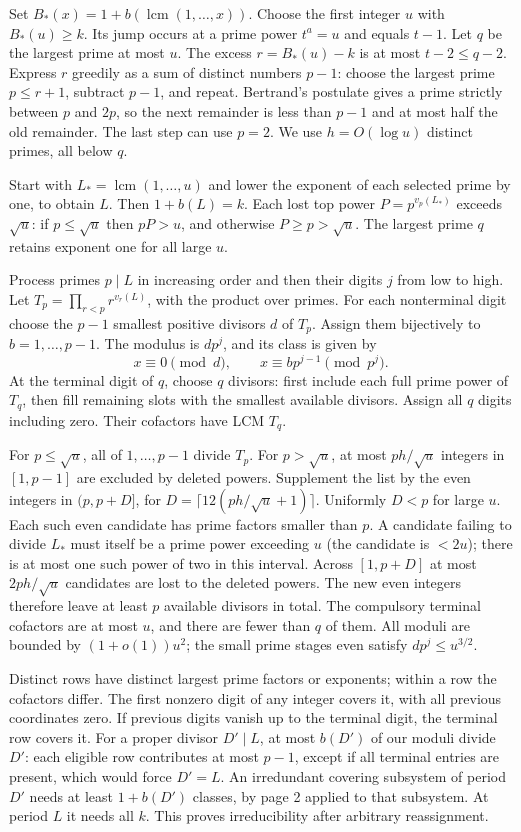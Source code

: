 \documentclass[11pt]{article}
\newcommand{\head}[1]{\vspace{4pt}{\large\bfseries\color{ink}#1}\par}
\newcommand{\lcm}{\operatorname{lcm}}
\begin{document}
\newpage
\head{2. Constructing exactly $k$ indispensable classes}
Set $B_*(x)=1+b(\lcm(1,\ldots,x))$. Choose the first integer $u$ with $B_*(u)\ge k$. Its jump occurs at a prime power $t^a=u$ and equals $t-1$. Let $q$ be the largest prime at most $u$. The excess $r=B_*(u)-k$ is at most $t-2\le q-2$. Express $r$ greedily as a sum of distinct numbers $p-1$: choose the largest prime $p\le r+1$, subtract $p-1$, and repeat. Bertrand's postulate gives a prime strictly between $p$ and $2p$, so the next remainder is less than $p-1$ and at most half the old remainder. The last step can use $p=2$. We use $h=O(\log u)$ distinct primes, all below $q$.

Start with $L_*=\lcm(1,\ldots,u)$ and lower the exponent of each selected prime by one, to obtain $L$. Then $1+b(L)=k$. Each lost top power $P=p^{v_p(L_*)}$ exceeds $\sqrt u$: if $p\le\sqrt u$ then $pP>u$, and otherwise $P\ge p>\sqrt u$. The largest prime $q$ retains exponent one for all large $u$.

Process primes $p\mid L$ in increasing order and then their digits $j$ from low to high. Let $T_p=\prod_{r<p}r^{v_r(L)}$, with the product over primes. For each nonterminal digit choose the $p-1$ smallest positive divisors $d$ of $T_p$. Assign them bijectively to $b=1,\ldots,p-1$. The modulus is $dp^j$, and its class is given by
\[
 x\equiv0\pmod d,\qquad x\equiv b p^{j-1}\pmod {p^j}.
\]
At the terminal digit of $q$, choose $q$ divisors: first include each full prime power of $T_q$, then fill remaining slots with the smallest available divisors. Assign all $q$ digits including zero. Their cofactors have LCM $T_q$.

For $p\le\sqrt u$, all of $1,\ldots,p-1$ divide $T_p$. For $p>\sqrt u$, at most $ph/\sqrt u$ integers in $[1,p-1]$ are excluded by deleted powers. Supplement the list by the even integers in $(p,p+D]$, for $D=\lceil 12(ph/\sqrt u+1)\rceil$. Uniformly $D<p$ for large $u$. Each such even candidate has prime factors smaller than $p$. A candidate failing to divide $L_*$ must itself be a prime power exceeding $u$ (the candidate is $<2u$); there is at most one such power of two in this interval. Across $[1,p+D]$ at most $2ph/\sqrt u$ candidates are lost to the deleted powers. The new even integers therefore leave at least $p$ available divisors in total. The compulsory terminal cofactors are at most $u$, and there are fewer than $q$ of them. All moduli are bounded by $(1+o(1))u^2$; the small prime stages even satisfy $dp^j\le u^{3/2}$.

Distinct rows have distinct largest prime factors or exponents; within a row the cofactors differ. The first nonzero digit of any integer covers it, with all previous coordinates zero. If previous digits vanish up to the terminal digit, the terminal row covers it. For a proper divisor $D'\mid L$, at most $b(D')$ of our moduli divide $D'$: each eligible row contributes at most $p-1$, except if all terminal entries are present, which would force $D'=L$. An irredundant covering subsystem of period $D'$ needs at least $1+b(D')$ classes, by page 2 applied to that subsystem. At period $L$ it needs all $k$. This proves irreducibility after arbitrary reassignment.
\end{document}
